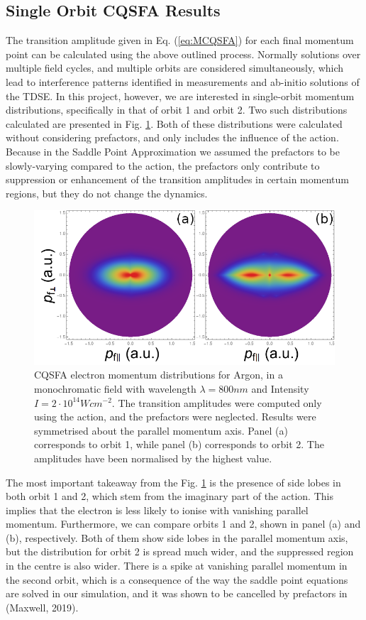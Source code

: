 \documentclass[11pt]{article}
\numberwithin{equation}{section}
\begin{document}
\subsection{Single Orbit CQSFA Results}\label{ch:Single_CQSFA}

The transition amplitude given in Eq. (\ref{eq:MCQSFA}) for each final momentum point can be calculated using the above outlined process. Normally solutions over multiple field cycles, and multiple orbits are considered simultaneously, which lead to interference patterns identified in measurements and ab-initio solutions of the TDSE\cite{bauer_2006_qprop}. In this project, however, we are interested in single-orbit momentum distributions, specifically in that of orbit 1 and orbit 2. Two such distributions calculated are presented in Fig. \ref{fig:CQSFA_orb1_2}. Both of these distributions were calculated without considering prefactors, and only includes the influence of the action. Because in the Saddle Point Approximation we assumed the prefactors to be slowly-varying compared to the action, the prefactors only contribute to suppression or enhancement of the transition amplitudes in certain momentum regions, but they do not change the dynamics.
\begin{figure}[!htb]
    \centering
    \includegraphics[width=12cm]{Figures/CQSFA_800_2e14_1_5up_sym_orb12.png}
    \caption{CQSFA electron momentum distributions for Argon, in a monochromatic field with wavelength $\lambda = 800nm$ and Intensity $I=2\cdot 10^{14}Wcm^{-2}$. The transition amplitudes were computed only using the action, and the prefactors were neglected. Results were symmetrised about the parallel momentum axis. Panel (a) corresponds to orbit 1, while panel (b) corresponds to orbit 2. The amplitudes have been normalised by the highest value.}
    \label{fig:CQSFA_orb1_2}
\end{figure}
The most important takeaway from the Fig. \ref{fig:CQSFA_orb1_2} is the presence of side lobes in both orbit 1 and 2, which stem from the imaginary part of the action\cite{maxwell_2019_strongfield}. This implies that the electron is less likely to ionise with vanishing parallel momentum.
Furthermore, we can compare orbits 1 and 2, shown in panel (a) and (b), respectively. Both of them show side lobes in the parallel momentum axis, but the distribution for orbit 2 is spread much wider, and the suppressed region in the centre is also wider. There is a spike at vanishing parallel momentum in the second orbit, which is a consequence of the way the saddle point equations are solved in our simulation, and it was shown to be cancelled by prefactors in (Maxwell, 2019)\cite{maxwell_2019_strongfield}.
\end{document}
